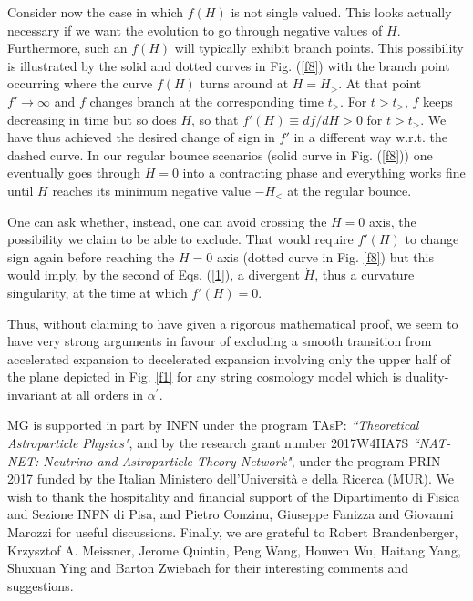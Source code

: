 \documentclass[a4paper,11pt]{article}
\def \ap {\alpha^{\prime}}
\begin{document}
 Consider now the case in which $f(H)$ is not single valued.
 This looks actually necessary if we want the evolution to go through negative values of $H$. Furthermore, such an $f(H)$ will typically exhibit branch points. This possibility is illustrated by the solid and dotted curves in Fig. (\ref{f8}) with the branch point occurring where the curve $f(H)$ turns around at $H=H_>$. At that point $f' \to \infty$ and $f$ changes branch at the corresponding time $t_>$. For $t >t_>$, $f$ keeps decreasing in time but so does $H$, so that $f'(H) \equiv df/dH > 0$ for $t >t_>$. We have thus achieved the desired change of sign in $f'$ in a different way w.r.t. the dashed curve. In our regular bounce scenarios  (solid curve in Fig. (\ref{f8})) one eventually goes through $H=0$ into a contracting phase and everything works fine until $H$ reaches its minimum negative value $-H_<$ at the regular bounce.

One can ask whether, instead, one can avoid crossing the $H =0$ axis, the possibility we claim to be able to exclude. That would require $f'(H)$ to change sign again before reaching the $H=0$ axis (dotted curve in Fig. \ref{f8}) but  this would imply, by the second of Eqs. (\ref{1}), a divergent $\dot{H}$, thus a curvature singularity, at the time at which $f'(H)=0$. 

Thus, without claiming to have given a rigorous mathematical proof, we seem to have very strong arguments in favour of excluding a smooth transition 
from accelerated expansion to decelerated expansion involving only the upper half of the plane depicted in Fig. \ref{f1} for any string cosmology model which is duality-invariant at all orders in $\ap$.


\acknowledgments

MG  is supported in part by INFN under the program TAsP: {\it ``Theoretical Astroparticle Physics"}, and by the research grant number 2017W4HA7S {\it ``NAT-NET: Neutrino and Astroparticle Theory Network"}, under the program PRIN 2017 funded by the Italian Ministero dell'Universit\`a e della Ricerca (MUR). We wish to thank the hospitality and financial support of the Dipartimento di Fisica and Sezione INFN di Pisa, and Pietro Conzinu, Giuseppe Fanizza and Giovanni Marozzi for useful discussions.
Finally, we are grateful to Robert Brandenberger, Krzysztof A. Meissner, Jerome Quintin, Peng Wang, Houwen Wu, Haitang Yang, Shuxuan Ying  and Barton Zwiebach for their interesting comments and suggestions.
\end{document}
